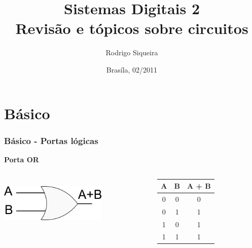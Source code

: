 \documentclass{beamer}
\title{Sistemas Digitais 2\\ \textbf{Revisão e tópicos sobre circuitos}}
\author{Rodrigo Siqueira}
\date{Brasíla, 02/2011}
\institute{\textbf{Universidade de Brasília - Faculdade do Gama}}
\begin{document}
\begin{frame}
  \titlepage
\end{frame}

\section{Básico}
\begin{frame}
  \frametitle{Básico - Portas lógicas}
\begin{center}
  \textbf{\huge{Porta OR}}
  \begin{columns}[c]
   \begin{column}{5cm}
    \includegraphics[height = 1in, width = 2in]{or.png}
   \end{column}\pause
   \begin{column}{5cm}
    \begin{tabular}{|c|c|c|}
     \hline
     A & B & A + B \\
     \hline	
     0 & 0 & 0 \\
     0 & 1 & 1 \\
     1 & 0 & 1 \\
     1 & 1 & 1 \\ 
     \hline
    \end{tabular}
   \end{column}

  \end{columns}
\end{center}
\end{frame}
\end{document}
